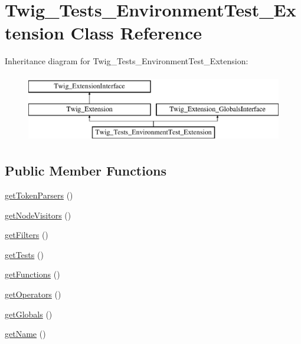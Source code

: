 \hypertarget{classTwig__Tests__EnvironmentTest__Extension}{}\section{Twig\+\_\+\+Tests\+\_\+\+Environment\+Test\+\_\+\+Extension Class Reference}
\label{classTwig__Tests__EnvironmentTest__Extension}
Inheritance diagram for Twig\+\_\+\+Tests\+\_\+\+Environment\+Test\+\_\+\+Extension\+:\begin{figure}[H]
\begin{center}
\leavevmode
\includegraphics[height=3.000000cm]{classTwig__Tests__EnvironmentTest__Extension}
\end{center}
\end{figure}
\subsection*{Public Member Functions}
\begin{DoxyCompactItemize}
\item 
\hyperlink{classTwig__Tests__EnvironmentTest__Extension_a8f0945b3d78191abda6fa4e6321ba6e0}{get\+Token\+Parsers} ()
\item 
\hyperlink{classTwig__Tests__EnvironmentTest__Extension_aaa16dbb112de36f252b3cb982a5667fb}{get\+Node\+Visitors} ()
\item 
\hyperlink{classTwig__Tests__EnvironmentTest__Extension_ab9b466d522cde2fbc43a360e5c8d9eb1}{get\+Filters} ()
\item 
\hyperlink{classTwig__Tests__EnvironmentTest__Extension_aae8bb4cc3d9bfb43f442cb03938cc5cd}{get\+Tests} ()
\item 
\hyperlink{classTwig__Tests__EnvironmentTest__Extension_aa940feb0e46b376496bf8b28849fc8cb}{get\+Functions} ()
\item 
\hyperlink{classTwig__Tests__EnvironmentTest__Extension_a053f0c5380266ab812ac961fb216b35f}{get\+Operators} ()
\item 
\hyperlink{classTwig__Tests__EnvironmentTest__Extension_a0f3b4691f7662eab32eaf0071aa50a61}{get\+Globals} ()
\item 
\hyperlink{classTwig__Tests__EnvironmentTest__Extension_a9288ce4dd0afb92c2513867d9b4d5f4c}{get\+Name} ()
\end{DoxyCompactItemize}


